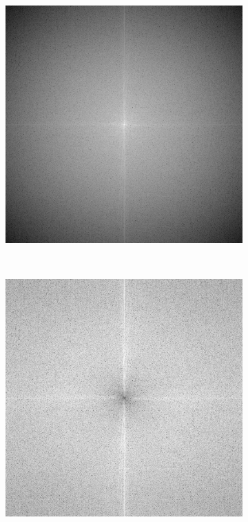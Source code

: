 \documentclass[
	article,			%
	11pt,				%
	oneside,			%
	a4paper,			%
	english,			%
	brazil,				%
	sumario=tradicional
	]{abntex2}
\begin{document}
\begin{figure}
		\centering
        \begin{subfigure}[b]{0.3\textwidth}
                \includegraphics[width=\textwidth,scale=1]{imagens/ex2/filtradaPBSpec.png}
                \caption{}
                \label{fig:passaBaixa}
        \end{subfigure}%
        ~ %
        \begin{subfigure}[b]{0.3\textwidth}
                \includegraphics[width=\textwidth,scale=1]{imagens/ex2/filtradaPASpec.png}

\end{subfigure}
\end{figure}
\end{document}
